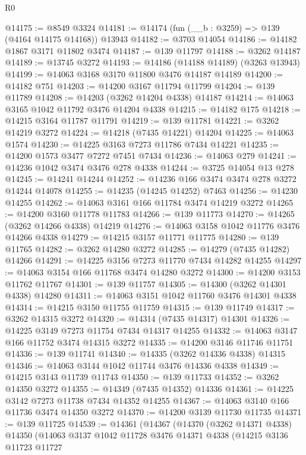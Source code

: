 \begin{lexlean}{R0}
\begin{coremodule}
@14175 := @8549 @3324
@14181 := @14174 (fun (__b : @3259) => @139 (@4164 @14175 @14168)) @13943
@14182 := @3703 @14054
@14186 := @14182 @1867 @3171 @11802 @3474
@14187 := @139 @11797
@14188 := @3262 @14187
@14189 := @13745 @3272
@14193 := @14186 (@14188 @14189) (@3263 @13943)
@14199 := @14063 @3168 @3170 @11800 @3476 @14187 @14189
@14200 := @14182 @751
@14203 := @14200 @3167 @11794 @11799
@14204 := @139 @11789
@14208 := @14203 (@3262 @14204 @4338) @14187
@14214 := @14063 @3165 @1042 @11792 @3476 @14204 @4338
@14215 := @14182 @175
@14218 := @14215 @3164 @11787 @11791
@14219 := @139 @11781
@14221 := @3262 @14219 @3272
@14224 := @14218 (@7435 @14221) @14204
@14225 := @14063 @1574
@14230 := @14225 @3163 @7273 @11786 @7434 @14221
@14235 := @14200 @1573 @3477 @7272 @7451 @7434
@14236 := @14063 @279
@14241 := @14236 @1042 @3474 @3476 @278 @4338
@14244 := @3725 @14054 @13 @278
@14245 := @14241 @14244
@14252 := @14236 @166 @3474 @3474 @278 @3272 @14244 @14078
@14255 := @14235 (@14245 @14252) @7463
@14256 := @14230 @14255
@14262 := @14063 @3161 @166 @11784 @3474 @14219 @3272
@14265 := @14200 @3160 @11778 @11783
@14266 := @139 @11773
@14270 := @14265 (@3262 @14266 @4338) @14219
@14276 := @14063 @3158 @1042 @11776 @3476 @14266 @4338
@14279 := @14215 @3157 @11771 @11775
@14280 := @139 @11765
@14282 := @3262 @14280 @3272
@14285 := @14279 (@7435 @14282) @14266
@14291 := @14225 @3156 @7273 @11770 @7434 @14282 @14255
@14297 := @14063 @3154 @166 @11768 @3474 @14280 @3272
@14300 := @14200 @3153 @11762 @11767
@14301 := @139 @11757
@14305 := @14300 (@3262 @14301 @4338) @14280
@14311 := @14063 @3151 @1042 @11760 @3476 @14301 @4338
@14314 := @14215 @3150 @11755 @11759
@14315 := @139 @11749
@14317 := @3262 @14315 @3272
@14320 := @14314 (@7435 @14317) @14301
@14326 := @14225 @3149 @7273 @11754 @7434 @14317 @14255
@14332 := @14063 @3147 @166 @11752 @3474 @14315 @3272
@14335 := @14200 @3146 @11746 @11751
@14336 := @139 @11741
@14340 := @14335 (@3262 @14336 @4338) @14315
@14346 := @14063 @3144 @1042 @11744 @3476 @14336 @4338
@14349 := @14215 @3143 @11739 @11743
@14350 := @139 @11733
@14352 := @3262 @14350 @3272
@14355 := @14349 (@7435 @14352) @14336
@14361 := @14225 @3142 @7273 @11738 @7434 @14352 @14255
@14367 := @14063 @3140 @166 @11736 @3474 @14350 @3272
@14370 := @14200 @3139 @11730 @11735
@14371 := @139 @11725
@14539 := @14361
    (@14367
      (@14370
        (@3262 @14371 @4338)
        @14350
        (@14063
          @3137
          @1042
          @11728
          @3476
          @14371
          @4338
          (@14215
            @3136
            @11723
            @11727

\end{coremodule}
\end{lexlean}
